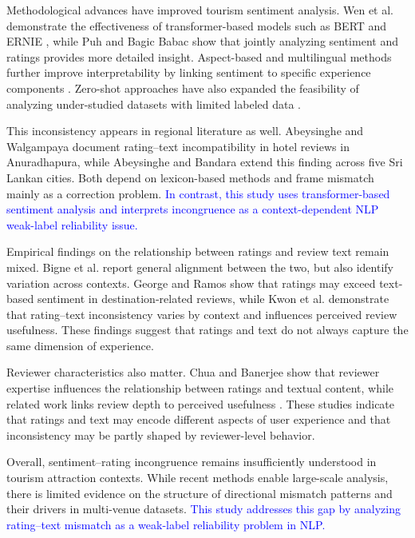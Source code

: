 \documentclass[conference]{IEEEtran}
\newcommand{\changed}[1]{\textcolor{blue}{#1}}
\begin{document}
Methodological advances have improved tourism sentiment analysis.
Wen et al. \cite{Wen} demonstrate the effectiveness of transformer-based
models such as BERT \cite{Devlin} and ERNIE \cite{Sun}, while Puh and Bagic Babac \cite{Puh} show
that jointly analyzing sentiment and ratings provides more detailed insight.
Aspect-based and multilingual methods further improve
interpretability by linking sentiment to specific experience components
\cite{Chu2022,Ali}. Zero-shot approaches have also expanded the
feasibility of analyzing under-studied datasets with limited labeled data
\cite{Nawawi}.

This inconsistency appears in regional literature as well. Abeysinghe and Walgampaya \cite{walgampaya} document rating–text incompatibility in hotel reviews in Anuradhapura, while Abeysinghe and Bandara \cite{abeysinghe} extend this finding across five Sri Lankan cities. Both depend on lexicon-based methods and frame mismatch mainly as a correction problem. \changed{In contrast, this study uses transformer-based sentiment analysis and interprets incongruence as a context-dependent NLP weak-label reliability issue.}

Empirical findings on the relationship between ratings and review text remain
mixed. Bigne et al. \cite{Bigne} report general alignment between the two, but also
identify variation across contexts. George and Ramos \cite{George} show that ratings may
exceed text-based sentiment in destination-related reviews, while Kwon et al.
\cite{Kwon} demonstrate that rating--text inconsistency varies by context and
influences perceived review usefulness. These findings suggest that ratings and
text do not always capture the same dimension of experience.

Reviewer characteristics also matter. Chua and Banerjee \cite{Chua} show that
reviewer expertise influences the relationship between ratings and textual
content, while related work links review depth to
perceived usefulness \cite{Chua,Ameur}. These studies indicate that
ratings and text may encode different aspects of user experience and that
inconsistency may be partly shaped by reviewer-level behavior.

Overall, sentiment–rating incongruence remains insufficiently understood in tourism attraction contexts. While recent methods enable large-scale analysis, there is limited evidence on the structure of directional mismatch patterns and their drivers in multi-venue datasets. \changed{This study addresses this gap by analyzing rating–text mismatch as a weak-label reliability problem in NLP.}
\end{document}
